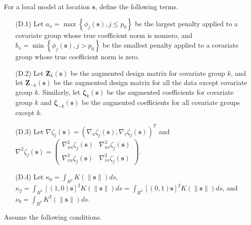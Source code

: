 \documentclass[12pt,english,authoryear, review]{article}\usepackage[]{graphicx}\usepackage[]{color}
\theoremstyle{plain}
\theoremstyle{plain}
\begin{document}
For a local model at location $\bm{s}$, define the following terms.
\begin{itemize}
\item[(D.1)] Let $a_{n}=\max\left\{ \phi_{j}\left(\bm{s}\right),j\le p_{0}\right\} $
be the largest penalty applied to a covariate group whose true coefficient
norm is nonzero, and $b_{n}=\min\left\{ \phi_{j}\left(\bm{s}\right),j>p_{0}\right\} $
be the smallest penalty applied to a covariate group whose true coefficient
norm is zero.
\item[(D.2)] Let $\bm{Z}_{k}\left(\bm{s}\right)$ be the augmented design matrix
for covariate group $k$, and let $\bm{Z}_{-k}\left(\bm{s}\right)$
be the augmented design matrix for all the data except covariate group
$k$. Similarly, let $\bm{\zeta}_{k}\left(\bm{s}\right)$ be the augmented
coefficients for covariate group $k$ and $\bm{\zeta}_{-k}\left(\bm{s}\right)$
be the augmented coefficients for all covariate groups except $k$.
\item[(D.3)] Let $\nabla\zeta_{j}\left(\bm{s}\right)=\left(\nabla_{u}\zeta_{j}\left(\bm{s}\right),\nabla_{v}\zeta_{j}\left(\bm{s}\right)\right)^{T}$
and $\nabla^{2}\zeta_{j}\left(\bm{s}\right)=\left(\begin{array}{cc}
\nabla_{uu}^{2}\zeta_{j}\left(\bm{s}\right) & \nabla_{uv}^{2}\zeta_{j}\left(\bm{s}\right)\\
\nabla_{vu}^{2}\zeta_{j}\left(\bm{s}\right) & \nabla_{vv}^{2}\zeta_{j}\left(\bm{s}\right)
\end{array}\right)$.
\item[(D.4)] Let $\kappa_{0}=\int_{R^{2}}K\left(\|\bm{s}\|\right)ds$, $\kappa_{2}=\int_{R^{2}}[(1,0)\bm{s}]^{2}K\left(\|\bm{s}\|\right)ds=\int_{R^{2}}[(0,1)\bm{s}]^{2}K\left(\|\bm{s}\|\right)ds$,
and $\nu_{0}=\int_{R^{2}}K^{2}\left(\|\bm{s}\|\right)ds$.
\end{itemize}
Assume the following conditions.
\end{document}
